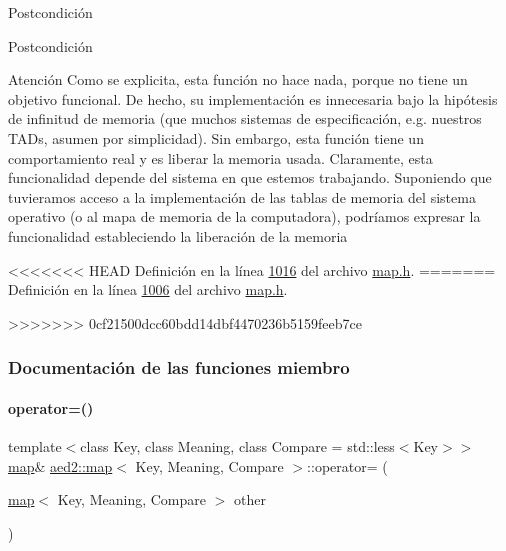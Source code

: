 \begin{DoxyPostcond}{\-Postcondición}
\begin{DoxyPostcond}{\-Postcondición}
\begin{DoxyAttention}{Atención}
Como se explicita, esta función no hace nada, porque no tiene un objetivo funcional. De hecho, su implementación es innecesaria bajo la hipótesis de infinitud de memoria (que muchos sistemas de especificación, e.\+g. nuestros T\+A\+Ds, asumen por simplicidad). Sin embargo, esta función tiene un comportamiento real y es liberar la memoria usada. Claramente, esta funcionalidad depende del sistema en que estemos trabajando. Suponiendo que tuvieramos acceso a la implementación de las tablas de memoria del sistema operativo (o al mapa de memoria de la computadora), podríamos expresar la funcionalidad estableciendo la liberación de la memoria 
\end{DoxyAttention}


<<<<<<< HEAD
\-Definición en la línea \hyperlink{map_8h_source_l01016}{1016} del archivo \hyperlink{map_8h_source}{map.\-h}.
=======
Definición en la línea \hyperlink{map_8h_source_l01006}{1006} del archivo \hyperlink{map_8h_source}{map.\+h}.

>>>>>>> 0cf21500dcc60bdd14dbf4470236b5159feeb7ce


\subsubsection{Documentación de las funciones miembro}
\mbox{\label{classaed2_1_1map_ac606d334809066929522964d45e76317_ac606d334809066929522964d45e76317}} 
\paragraph{\texorpdfstring{operator=()}{operator=()}}
{\footnotesize\ttfamily template$<$class Key, class Meaning, class Compare = std\+::less$<$\+Key$>$$>$ \\
\hyperlink{classaed2_1_1map}{map}\& \hyperlink{classaed2_1_1map}{aed2\+::map}$<$ Key, Meaning, Compare $>$\+::operator= (\begin{DoxyParamCaption}\item[{\hyperlink{classaed2_1_1map}{map}$<$ Key, Meaning, Compare $>$}]{other }\end{DoxyParamCaption})\hspace{0.3cm}{\ttfamily [inline]}}




\end{DoxyPostcond}
\end{DoxyPostcond}
